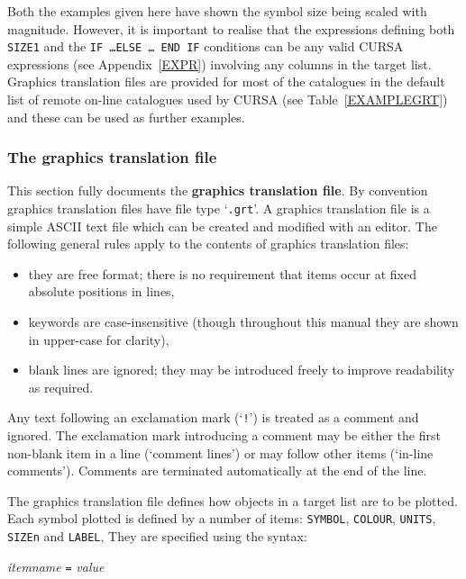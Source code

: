\documentclass[twoside,11pt]{article}
\renewcommand{\_}{\texttt{\symbol{95}}}
\begin{document}
Both the examples given here have shown the symbol size being scaled
with magnitude.  However, it is important to realise that the
expressions defining both {\tt SIZE1} and the {\tt IF \ldots ELSE \ldots
END IF} conditions can be any valid CURSA expressions (see
Appendix~\ref{EXPR}) involving any columns in the target list.  Graphics
translation files are provided for most of the catalogues in the default
list of remote on-line catalogues used by CURSA (see Table~\ref{EXAMPLEGRT})
and these can be used as further examples.

\subsubsection{The graphics translation file}

This section fully documents the {\bf graphics translation file}.
By convention graphics translation files have file type `{\tt .grt}'.
A graphics translation file is a simple ASCII text file which
can be created and modified with an editor.  The following general
rules apply to the contents of graphics translation files:

\begin{itemize}

  \item they are free format; there is no requirement that items occur
   at fixed absolute positions in lines,

  \item keywords are case-insensitive (though throughout this manual they
   are shown in upper-case for clarity),

  \item blank lines are ignored; they may be introduced freely to
   improve readability as required.

\end{itemize}

Any text following an exclamation mark (`{\tt !}') is treated as a
comment and ignored.  The exclamation mark introducing a comment may
be either the first non-blank item in a line (`comment lines') or
may follow other items (`in-line comments').  Comments are terminated
automatically at the end of the line.

The graphics translation file defines how objects in a target list are
to be plotted.  Each symbol plotted is defined by a number of items:
{\tt SYMBOL}, {\tt COLOUR}, {\tt UNITS}, {\tt SIZEn} and {\tt LABEL},
They are specified using the syntax:

\begin{center}
{\it item\_name} {\tt =} {\it value}
\end{center}
\end{document}
